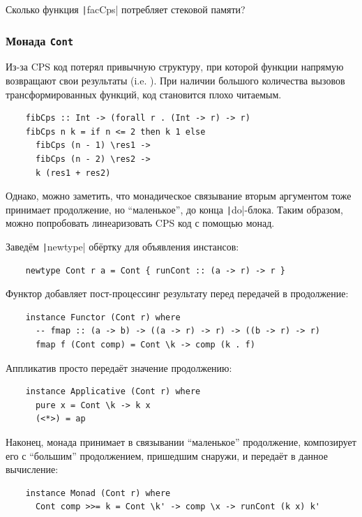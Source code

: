 \begin{task}
    Сколько функция \texttt|facCps| потребляет стековой памяти?
\end{task}

\subsubsection{Монада \texttt{Cont}}

Из-за CPS код потерял привычную структуру, при которой функции напрямую возвращают свои результаты (i.e. ).
При наличии большого количества вызовов трансформированных функций, код становится плохо читаемым.

\begin{verbatim}
    fibCps :: Int -> (forall r . (Int -> r) -> r)
    fibCps n k = if n <= 2 then k 1 else
      fibCps (n - 1) \res1 ->
      fibCps (n - 2) \res2 ->
      k (res1 + res2)
\end{verbatim}

Однако, можно заметить, что монадическое связывание вторым аргументом тоже принимает продолжение, но ``маленькое'', до конца \texttt|do|-блока.
Таким образом, можно попробовать линеаризовать CPS код с помощью монад.

Заведём \texttt|newtype| обёртку для объявления инстансов:
\begin{verbatim}
    newtype Cont r a = Cont { runCont :: (a -> r) -> r }
\end{verbatim}

Функтор добавляет пост-процессинг результату перед передачей в продолжение:
\begin{verbatim}
    instance Functor (Cont r) where
      -- fmap :: (a -> b) -> ((a -> r) -> r) -> ((b -> r) -> r)
      fmap f (Cont comp) = Cont \k -> comp (k . f)
\end{verbatim}

Аппликатив просто передаёт значение продолжению:
\begin{verbatim}
    instance Applicative (Cont r) where
      pure x = Cont \k -> k x
      (<*>) = ap
\end{verbatim}

Наконец, монада принимает в связывании ``маленькое'' продолжение, композирует его с ``большим'' продолжением, пришедшим снаружи, и передаёт в данное вычисление:
\begin{verbatim}
    instance Monad (Cont r) where
      Cont comp >>= k = Cont \k' -> comp \x -> runCont (k x) k'
\end{verbatim}


